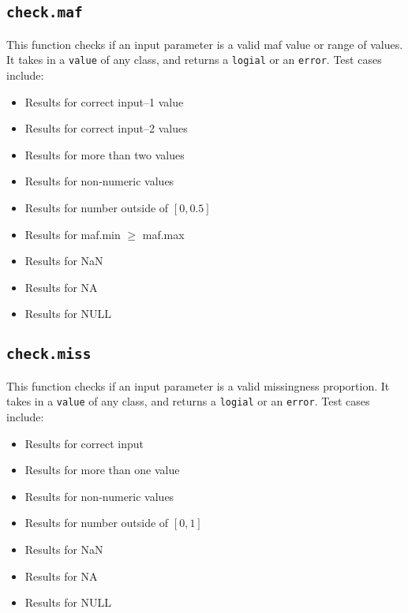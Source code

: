 \documentclass[11pt]{article}
\begin{document}
\subsection{\texttt{check.maf}}
This function checks if an input parameter is a valid maf value or range of values. It takes in a \texttt{value} of any class, and returns a \texttt{logial} or an \texttt{error}. Test cases include:
\begin{itemize}
	\item Results for correct input--1 value
	\item Results for correct input--2 values
	\item Results for more than two values
	\item Results for non-numeric values
	\item Results for number outside of $[0, 0.5]$
	\item Results for maf.min $\geq$ maf.max
	\item Results for NaN
	\item Results for NA
	\item Results for NULL
\end{itemize}

\subsection{\texttt{check.miss}}
This function checks if an input parameter is a valid missingness proportion. It takes in a \texttt{value} of any class, and returns a \texttt{logial} or an \texttt{error}. Test cases include:
\begin{itemize}
	\item Results for correct input
	\item Results for more than one value
	\item Results for non-numeric values
	\item Results for number outside of $[0, 1]$
	\item Results for NaN
	\item Results for NA
	\item Results for NULL
\end{itemize}
\end{document}
